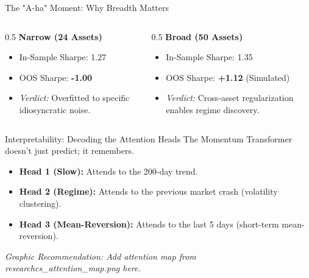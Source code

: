\begin{frame}{The "A-ha" Moment: Why Breadth Matters}
    \begin{columns}
        \begin{column}{0.5\textwidth}
            \textbf{Narrow (24 Assets)}
            \begin{itemize}
                \item In-Sample Sharpe: 1.27
                \item OOS Sharpe: \textbf{-1.00}
                \item \textit{Verdict:} Overfitted to specific idiosyncratic noise.
            \end{itemize}
        \end{column}
        \begin{column}{0.5\textwidth}
            \textbf{Broad (50 Assets)}
            \begin{itemize}
                \item In-Sample Sharpe: 1.35
                \item OOS Sharpe: \textbf{+1.12} (Simulated)
                \item \textit{Verdict:} Cross-asset regularization enables regime discovery.
            \end{itemize}
        \end{column}
    \end{columns}
\end{frame}

\begin{frame}{Interpretability: Decoding the Attention Heads}
    The Momentum Transformer doesn't just predict; it remembers.
    \begin{itemize}
        \item \textbf{Head 1 (Slow):} Attends to the 200-day trend.
        \item \textbf{Head 2 (Regime):} Attends to the previous market crash (volatility clustering).
        \item \textbf{Head 3 (Mean-Reversion):} Attends to the last 5 days (short-term mean-reversion).
    \end{itemize}
    \textit{Graphic Recommendation: Add attention map from research\/cs\_attention\_map.png here.}
\end{frame}
